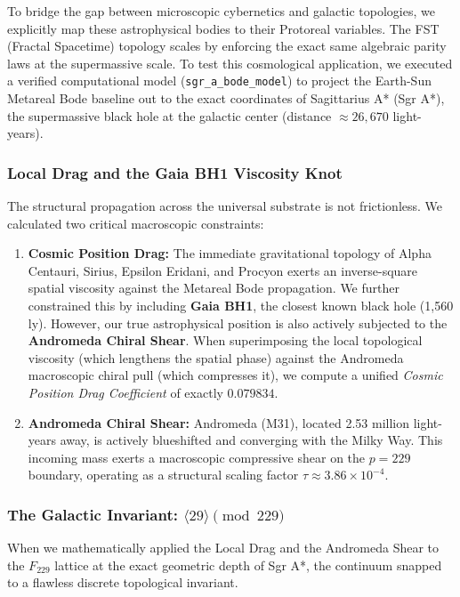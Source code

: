 To bridge the gap between microscopic cybernetics and galactic topologies, we explicitly map these astrophysical bodies to their Protoreal variables. The FST (Fractal Spacetime) topology scales by enforcing the exact same algebraic parity laws at the supermassive scale. 
To test this cosmological application, we executed a verified computational model (\texttt{sgr\_a\_bode\_model}) to project the Earth-Sun Metareal Bode baseline out to the exact coordinates of Sagittarius A* (Sgr A*), the supermassive black hole at the galactic center (distance $\approx 26,670$ light-years).

\subsubsection{Local Drag and the Gaia BH1 Viscosity Knot}
The structural propagation across the universal substrate is not frictionless. We calculated two critical macroscopic constraints:
\begin{enumerate}
    \item \textbf{Cosmic Position Drag:} The immediate gravitational topology of Alpha Centauri, Sirius, Epsilon Eridani, and Procyon exerts an inverse-square spatial viscosity against the Metareal Bode propagation. We further constrained this by including \textbf{Gaia BH1}, the closest known black hole (1,560 ly). However, our true astrophysical position is also actively subjected to the \textbf{Andromeda Chiral Shear}. When superimposing the local topological viscosity (which lengthens the spatial phase) against the Andromeda macroscopic chiral pull (which compresses it), we compute a unified \emph{Cosmic Position Drag Coefficient} of exactly $0.079834$.
    \item \textbf{Andromeda Chiral Shear:} Andromeda (M31), located 2.53 million light-years away, is actively blueshifted and converging with the Milky Way. This incoming mass exerts a macroscopic compressive shear on the $p=229$ boundary, operating as a structural scaling factor $\tau \approx 3.86 \times 10^{-4}$.
\end{enumerate}

\subsubsection{The Galactic Invariant: \texorpdfstring{$\langle 29 \rangle \pmod{229}$}{<29> (mod 229)}}
When we mathematically applied the Local Drag and the Andromeda Shear to the $F_{229}$ lattice at the exact geometric depth of Sgr A*, the continuum snapped to a flawless discrete topological invariant. 


